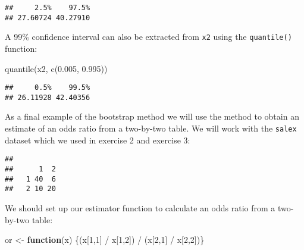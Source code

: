 \documentclass[
  12pt,
  a4paper]{book}
\newenvironment{Shaded}{\begin{snugshade}}{\end{snugshade}}
\newcommand{\AttributeTok}[1]{\textcolor[rgb]{0.77,0.63,0.00}{#1}}
\newcommand{\ConstantTok}[1]{\textcolor[rgb]{0.00,0.00,0.00}{#1}}
\newcommand{\ControlFlowTok}[1]{\textcolor[rgb]{0.13,0.29,0.53}{\textbf{#1}}}
\newcommand{\DecValTok}[1]{\textcolor[rgb]{0.00,0.00,0.81}{#1}}
\newcommand{\FloatTok}[1]{\textcolor[rgb]{0.00,0.00,0.81}{#1}}
\newcommand{\FunctionTok}[1]{\textcolor[rgb]{0.00,0.00,0.00}{#1}}
\newcommand{\NormalTok}[1]{#1}
\newcommand{\OtherTok}[1]{\textcolor[rgb]{0.56,0.35,0.01}{#1}}
\newcommand{\SpecialCharTok}[1]{\textcolor[rgb]{0.00,0.00,0.00}{#1}}
\newcommand{\StringTok}[1]{\textcolor[rgb]{0.31,0.60,0.02}{#1}}
\begin{document}
\begin{verbatim}
##     2.5%    97.5% 
## 27.60724 40.27910
\end{verbatim}

A 99\% confidence interval can also be extracted from \texttt{x2} using the \texttt{quantile()} function:

\begin{Shaded}
\begin{Highlighting}[]
\FunctionTok{quantile}\NormalTok{(x2, }\FunctionTok{c}\NormalTok{(}\FloatTok{0.005}\NormalTok{, }\FloatTok{0.995}\NormalTok{))}
\end{Highlighting}
\end{Shaded}

\begin{verbatim}
##     0.5%    99.5% 
## 26.11928 42.40356
\end{verbatim}

As a final example of the bootstrap method we will use the method to obtain an estimate of an odds ratio from a two-by-two table. We will work with the \texttt{salex} dataset which we used in exercise 2 and exercise 3:

\begin{Shaded}
\end{Shaded}

\begin{verbatim}
##    
##      1  2
##   1 40  6
##   2 10 20
\end{verbatim}

We should set up our estimator function to calculate an odds ratio from a two-by-two table:

\begin{Shaded}
\begin{Highlighting}[]
\NormalTok{or }\OtherTok{\textless{}{-}} \ControlFlowTok{function}\NormalTok{(x) \{(x[}\DecValTok{1}\NormalTok{,}\DecValTok{1}\NormalTok{] }\SpecialCharTok{/}\NormalTok{ x[}\DecValTok{1}\NormalTok{,}\DecValTok{2}\NormalTok{]) }\SpecialCharTok{/}\NormalTok{ (x[}\DecValTok{2}\NormalTok{,}\DecValTok{1}\NormalTok{] }\SpecialCharTok{/}\NormalTok{ x[}\DecValTok{2}\NormalTok{,}\DecValTok{2}\NormalTok{])\}}
\end{Highlighting}
\end{Shaded}
\end{document}
